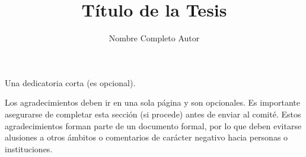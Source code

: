 \documentclass{umemoria}
\author{Nombre Completo Autor}
\title{Título de la Tesis}
\begin{document}
\frontmatter
\maketitle



\begin{dedicatoria}
Una dedicatoria corta (es opcional).
\end{dedicatoria}

\begin{thanks}
Los agradecimientos deben ir en una sola página y son opcionales. Es importante asegurarse de completar esta sección (si procede) antes de enviar al comité. Estos agradecimientos forman parte de un documento formal, por lo que deben evitarse alusiones a otros ámbitos o comentarios de carácter negativo hacia personas o instituciones.
\end{thanks}

\tableofcontents
\listoftables %
\listoffigures %


\mainmatter







\nocite{*}



\begin{appendices}
\end{appendices}
\end{document}

